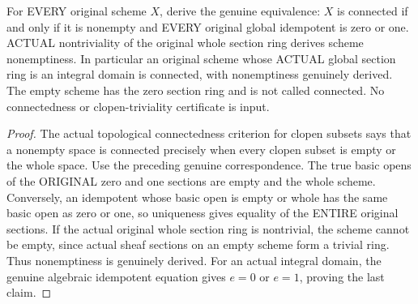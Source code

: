 \begin{theorem}
\label{scheme:actual-global-idempotents-connectedness}
\leanok
{}
For EVERY original scheme $X$, derive the genuine equivalence:
$X$ is connected if and only if it is nonempty and EVERY original global
idempotent is zero or one. ACTUAL nontriviality of the original whole
section ring derives scheme nonemptiness. In particular an original scheme
whose ACTUAL global section ring is an integral domain is connected, with
nonemptiness genuinely derived. The empty scheme has the zero section ring
and is not called connected. No connectedness or clopen-triviality
certificate is input.
\end{theorem}
\begin{proof}
The actual topological connectedness criterion for clopen subsets says that
a nonempty space is connected precisely when every clopen subset is empty
or the whole space. Use the preceding genuine correspondence. The true
basic opens of the ORIGINAL zero and one sections are empty and the whole
scheme. Conversely, an idempotent whose basic open is empty or whole has
the same basic open as zero or one, so uniqueness gives equality of the
ENTIRE original sections. If the actual original whole section ring is
nontrivial, the scheme cannot be empty, since actual sheaf sections on an
empty scheme form a trivial ring. Thus nonemptiness is genuinely derived.
For an actual integral domain, the genuine
algebraic idempotent equation gives $e=0$ or $e=1$, proving the last claim.
\end{proof}

